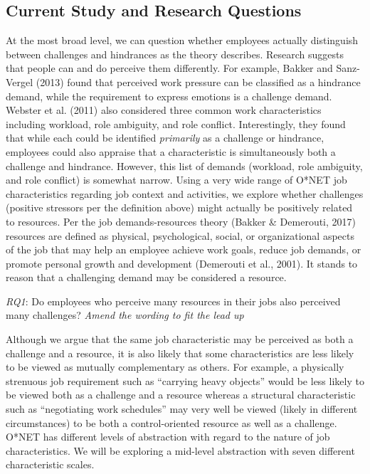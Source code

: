 \documentclass[
  jou]{apa6}
\begin{document}
\hypertarget{current-study-and-research-questions}{%
\subsection{Current Study and Research Questions}\label{current-study-and-research-questions}}

At the most broad level, we can question whether employees actually distinguish between challenges and hindrances as the theory describes. Research suggests that people can and do perceive them differently. For example, Bakker and Sanz-Vergel (2013) found that perceived work pressure can be classified as a hindrance demand, while the requirement to express emotions is a challenge demand. Webster et al. (2011) also considered three common work characteristics including workload, role ambiguity, and role conflict. Interestingly, they found that while each could be identified \emph{primarily} as a challenge or hindrance, employees could also appraise that a characteristic is simultaneously both a challenge and hindrance. However, this list of demands (workload, role ambiguity, and role conflict) is somewhat narrow. Using a very wide range of O*NET job characteristics regarding job context and activities, we explore whether challenges (positive stressors per the definition above) might actually be positively related to resources. Per the job demands-resources theory (Bakker \& Demerouti, 2017) resources are defined as physical, psychological, social, or organizational aspects of the job that may help an employee achieve work goals, reduce job demands, or promote personal growth and development (Demerouti et al., 2001). It stands to reason that a challenging demand may be considered a resource.

\emph{RQ1}: Do employees who perceive many resources in their jobs also perceived many challenges?
\emph{Amend the wording to fit the lead up}

Although we argue that the same job characteristic may be perceived as both a challenge and a resource, it is also likely that some characteristics are less likely to be viewed as mutually complementary as others. For example, a physically strenuous job requirement such as ``carrying heavy objects'' would be less likely to be viewed both as a challenge and a resource whereas a structural characteristic such as ``negotiating work schedules'' may very well be viewed (likely in different circumstances) to be both a control-oriented resource as well as a challenge. O*NET has different levels of abstraction with regard to the nature of job characteristics. We will be exploring a mid-level abstraction with seven different characteristic scales.
\end{document}
